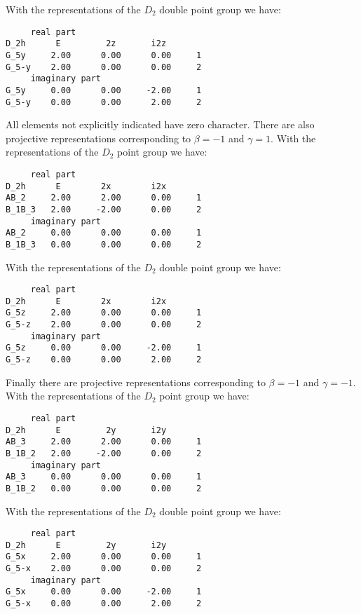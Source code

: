 \documentclass[12pt,a4paper]{article}
\begin{document}
With the representations of the $D_2$ double point group we have:
\begin{verbatim}
     real part
D_2h      E         2z       i2z
G_5y     2.00      0.00      0.00     1
G_5-y    2.00      0.00      0.00     2
     imaginary part
G_5y     0.00      0.00     -2.00     1
G_5-y    0.00      0.00      2.00     2
\end{verbatim}
All elements not explicitly indicated have zero character.
There are also projective representations corresponding to $\beta=-1$ 
and $\gamma=1$. With the representations of the $D_2$ point group we have:
\begin{verbatim}
     real part
D_2h      E        2x        i2x
AB_2     2.00      2.00      0.00     1
B_1B_3   2.00     -2.00      0.00     2
     imaginary part
AB_2     0.00      0.00      0.00     1
B_1B_3   0.00      0.00      0.00     2
\end{verbatim}
With the representations of the $D_2$ double point group we have:
\begin{verbatim}
     real part
D_2h      E        2x        i2x
G_5z     2.00      0.00      0.00     1
G_5-z    2.00      0.00      0.00     2
     imaginary part
G_5z     0.00      0.00     -2.00     1
G_5-z    0.00      0.00      2.00     2
\end{verbatim}
Finally there are projective representations corresponding to
$\beta=-1$ and $\gamma=-1$. With the representations of the $D_2$ point
group we have: 
\begin{verbatim}
     real part
D_2h      E         2y       i2y
AB_3     2.00      2.00      0.00     1
B_1B_2   2.00     -2.00      0.00     2
     imaginary part
AB_3     0.00      0.00      0.00     1
B_1B_2   0.00      0.00      0.00     2
\end{verbatim}
With the representations of the $D_2$ double point group we have:
\begin{verbatim}
     real part
D_2h      E         2y       i2y
G_5x     2.00      0.00      0.00     1
G_5-x    2.00      0.00      0.00     2
     imaginary part
G_5x     0.00      0.00     -2.00     1
G_5-x    0.00      0.00      2.00     2
\end{verbatim}

\newpage
\end{document}
